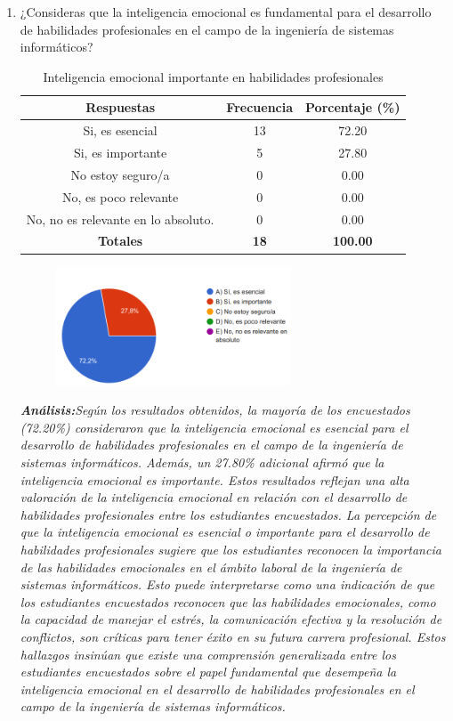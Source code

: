 \documentclass[journal]{IEEEtran}
\begin{document}
\begin{enumerate}
\item¿Consideras que la inteligencia emocional es fundamental para el desarrollo de habilidades profesionales en el campo de la ingeniería de sistemas informáticos?
	\begin{table}[H]
		\renewcommand{\arraystretch}{1.3}
		\centering
		\caption{Inteligencia emocional importante en habilidades profesionales}
		\begin{tabular}{c c c}
			\hline
			\textbf{Respuestas} & \textbf{Frecuencia} & \textbf{Porcentaje (\%)}\\
			\hline
			Si, es esencial & 13 & 72.20 \\
			Si, es importante & 5 & 27.80 \\
			No estoy seguro/a & 0 & 0.00\\
			No, es poco relevante & 0 & 0.00\\
			No, no es relevante en lo absoluto. & 0 & 0.00\\
			\hline
			\textbf{Totales} &\textbf{18}& \textbf{100.00}\\
			\hline
		\end{tabular}
	\end{table}
	\begin{figure}[h]
		\centering
		\includegraphics[width=07cm]{Pregunta 4}
	\end{figure}
	\textit{\textbf{Análisis:}Según los resultados obtenidos, la mayoría de los encuestados (72.20\%) consideraron que la inteligencia emocional es esencial para el desarrollo de habilidades profesionales en el campo de la ingeniería de sistemas informáticos. Además, un 27.80\% adicional afirmó que la inteligencia emocional es importante. Estos resultados reflejan una alta valoración de la inteligencia emocional en relación con el desarrollo de habilidades profesionales entre los estudiantes encuestados.
La percepción de que la inteligencia emocional es esencial o importante para el desarrollo de habilidades profesionales sugiere que los estudiantes reconocen la importancia de las habilidades emocionales en el ámbito laboral de la ingeniería de sistemas informáticos. Esto puede interpretarse como una indicación de que los estudiantes encuestados reconocen que las habilidades emocionales, como la capacidad de manejar el estrés, la comunicación efectiva y la resolución de conflictos, son críticas para tener éxito en su futura carrera profesional.
Estos hallazgos insinúan que existe una comprensión generalizada entre los estudiantes encuestados sobre el papel fundamental que desempeña la inteligencia emocional en el desarrollo de habilidades profesionales en el campo de la ingeniería de sistemas informáticos.
}\\


\end{enumerate}
\end{document}
